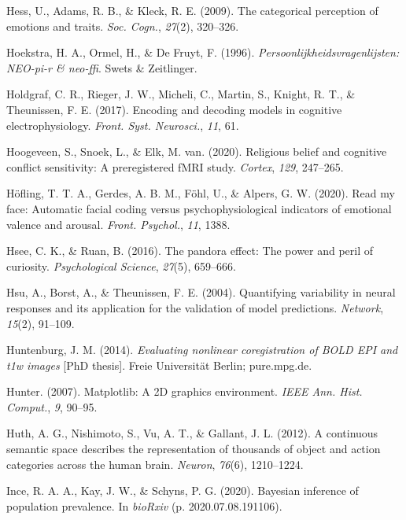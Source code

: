 \documentclass[12pt,american,a4paper,oneside,]{memoir} %
\begin{document}
\leavevmode\hypertarget{ref-Hess2009-br}{}%
Hess, U., Adams, R. B., \& Kleck, R. E. (2009). The categorical perception of emotions and traits. \emph{Soc. Cogn.}, \emph{27}(2), 320--326.

\leavevmode\hypertarget{ref-Hoekstra1996-kv}{}%
Hoekstra, H. A., Ormel, H., \& De Fruyt, F. (1996). \emph{Persoonlijkheidsvragenlijsten: NEO-pi-r \& neo-ffi}. Swets \& Zeitlinger.

\leavevmode\hypertarget{ref-Holdgraf2017-eu}{}%
Holdgraf, C. R., Rieger, J. W., Micheli, C., Martin, S., Knight, R. T., \& Theunissen, F. E. (2017). Encoding and decoding models in cognitive electrophysiology. \emph{Front. Syst. Neurosci.}, \emph{11}, 61.

\leavevmode\hypertarget{ref-Hoogeveen2020-qp}{}%
Hoogeveen, S., Snoek, L., \& Elk, M. van. (2020). Religious belief and cognitive conflict sensitivity: A preregistered fMRI study. \emph{Cortex}, \emph{129}, 247--265.

\leavevmode\hypertarget{ref-Hofling2020-mk}{}%
Höfling, T. T. A., Gerdes, A. B. M., Föhl, U., \& Alpers, G. W. (2020). Read my face: Automatic facial coding versus psychophysiological indicators of emotional valence and arousal. \emph{Front. Psychol.}, \emph{11}, 1388.

\leavevmode\hypertarget{ref-hsee2016pandora}{}%
Hsee, C. K., \& Ruan, B. (2016). The pandora effect: The power and peril of curiosity. \emph{Psychological Science}, \emph{27}(5), 659--666.

\leavevmode\hypertarget{ref-Hsu2004-hs}{}%
Hsu, A., Borst, A., \& Theunissen, F. E. (2004). Quantifying variability in neural responses and its application for the validation of model predictions. \emph{Network}, \emph{15}(2), 91--109.

\leavevmode\hypertarget{ref-Huntenburg2014-ps}{}%
Huntenburg, J. M. (2014). \emph{Evaluating nonlinear coregistration of BOLD EPI and t1w images} {[}PhD thesis{]}. Freie Universität Berlin; pure.mpg.de.

\leavevmode\hypertarget{ref-Hunter2007-at}{}%
Hunter. (2007). Matplotlib: A 2D graphics environment. \emph{IEEE Ann. Hist. Comput.}, \emph{9}, 90--95.

\leavevmode\hypertarget{ref-Huth2012-yc}{}%
Huth, A. G., Nishimoto, S., Vu, A. T., \& Gallant, J. L. (2012). A continuous semantic space describes the representation of thousands of object and action categories across the human brain. \emph{Neuron}, \emph{76}(6), 1210--1224.

\leavevmode\hypertarget{ref-Ince2020-mr}{}%
Ince, R. A. A., Kay, J. W., \& Schyns, P. G. (2020). Bayesian inference of population prevalence. In \emph{bioRxiv} (p. 2020.07.08.191106).
\end{document}
